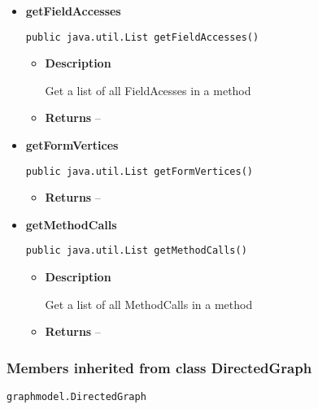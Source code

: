 {{{{{{{{{{{{{{{{{{\begin{itemize}
{\begin{itemize}
{Get the entry vertex of a method
}
\item{{\bf  Returns} -- 
 
}%
\end{itemize}
}%
\item{ 
{\bf  getFieldAccesses}\\
\begin{lstlisting}[frame=none]
public java.util.List getFieldAccesses()\end{lstlisting} %
\begin{itemize}
\item{
{\bf  Description}

Get a list of all FieldAcesses in a method
}
\item{{\bf  Returns} -- 
 
}%
\end{itemize}
}%
\item{ 
{\bf  getFormVertices}\\
\begin{lstlisting}[frame=none]
public java.util.List getFormVertices()\end{lstlisting} %
\begin{itemize}
\item{{\bf  Returns} -- 
 
}%
\end{itemize}
}%
\item{ 
{\bf  getMethodCalls}\\
\begin{lstlisting}[frame=none]
public java.util.List getMethodCalls()\end{lstlisting} %
\begin{itemize}
\item{
{\bf  Description}

Get a list of all MethodCalls in a method
}
\item{{\bf  Returns} -- 
 
}%
\end{itemize}
}%
\end{itemize}
}
\subsubsection{Members inherited from class DirectedGraph }{
\texttt{graphmodel.DirectedGraph} {\small 
{}}
{\small 

}}}}}}}}}}}}}}}}}}}
